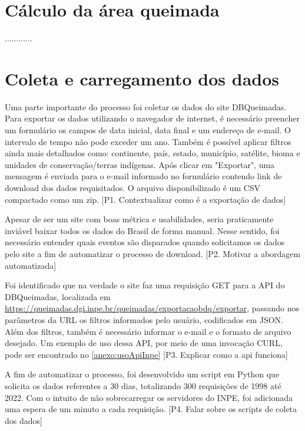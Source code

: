 \documentclass[cic,tc]{iiufrgs}
\begin{document}
\section{Cálculo da área queimada}

............


\section{Coleta e carregamento dos dados}

Uma parte importante do processo foi coletar os dados do site DBQueimadas. 
Para exportar os dados utilizando o navegador de internet, é necessário 
preencher um formulário os campos de data inicial,
data final e um endereço de e-mail. O intervalo de tempo não 
pode exceder um ano. Também é possível aplicar filtros ainda mais 
detalhados como: continente, país, estado, município, satélite, bioma e 
unidades de conservação/terras indígenas. Após clicar em "Exportar", 
uma mensagem é enviada para o e-mail informado no formulário contendo link de 
download dos dados requisitados. O arquivo disponibilizado é um CSV compactado 
como um zip. [P1. Contextualizar como é a exportação de dados]\par

Apesar de ser um site com boas métrica e usabilidades, seria praticamente 
inviável baixar todos os dados do Brasil de forma manual. Nesse sentido, 
foi necessário entender quais eventos são disparados quando solicitamos 
os dados pelo site a fim de automatizar o processo de download. 
[P2. Motivar a abordagem automatizada] \par

Foi identificado que na verdade o site faz uma requisição GET para a API do 
DBQueimadas, localizada em 
\url{https://queimadas.dgi.inpe.br/queimadas/exportacaobdq/exportar}, 
passando nos parâmetros da URL os filtros informados pelo usuário, codificados 
em JSON. Além dos filtros, também é necessário informar o e-mail e o formato 
de arquivo desejado. Um exemplo de uso dessa API, por meio de uma invocação CURL, 
pode ser encontrado no \ref{anexo:usoApiInpe} [P3. Explicar como a api funciona]

A fim de automatizar o processo, foi desenvolvido um script em Python que 
solicita os dados referentes a 30 dias, totalizando 300 requisições de 1998 
até 2022. Com 
o intuito de não sobrecarregar os servidores do INPE, foi adicionada uma espera de 
um minuto a cada requisição. [P4. Falar sobre os scripts de coleta dos dados] \par
\end{document}
